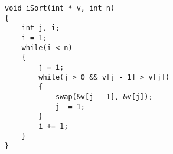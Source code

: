 \begin{lstlisting}[style=CStyle]
void iSort(int * v, int n)
{
    int j, i;
    i = 1;
    while(i < n)
    {
        j = i;
        while(j > 0 && v[j - 1] > v[j])
        {
            swap(&v[j - 1], &v[j]);
            j -= 1;
        }
        i += 1;
    }
}
\end{lstlisting}
    